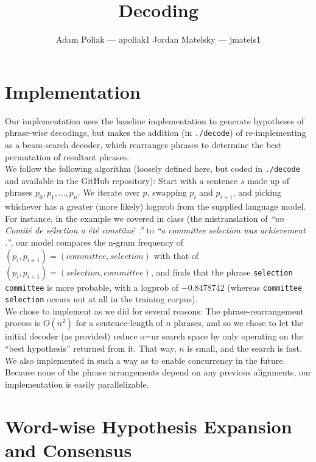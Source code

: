\documentclass[a4paper]{article}
\title{Decoding}
\author{Adam Poliak — apoliak1 \: Jordan Matelsky — jmatels1}
\begin{document}
\maketitle

\section{Implementation}
Our implementation uses the baseline implementation to generate hypotheses of phrase-wise decodings, but makes the addition (in \texttt{./decode}) of re-implementing as a beam-search decoder, which rearranges phrases to determine the best permutation of resultant phrases. \\

We follow the following algorithm (loosely defined here, but coded in \texttt{./decode} and available in the GitHub repository): Start with a sentence $s$ made up of phrases $p_0, p_1, \dots, p_n$. We iterate over $p$, swapping $p_i$ and $p_{i+1}$, and picking whichever has a greater (more likely) logprob from the supplied language model. \\

For instance, in the example we covered in class (the mistranslation of \textit{``un Comité de sélection a été constitué .''} to \textit{``a committee selection was achievement .''}, our model compares the n-gram frequency of $(p_i, p_{i+1})=({committee}, {selection})$ with that of $(p_i, p_{i+1})=({selection}, {committee})$, and finds that the phrase \texttt{selection committee} is more probable, with a logprob of $-0.8478742$ (whereas \texttt{committee selection} occurs not at all in the training corpus). \\

We chose to implement as we did for several reasons: The phrase-rearrangement process is $O(n^2)$ for a sentence-length of $n$ phrases, and so we chose to let the initial decoder (as provided) reduce o=ur search space  by only operating on the ``best hypothesis'' returned from it. That way, $n$ is small, and the search is fast. \\

We also implemented in such a way as to enable concurrency in the future. Because none of the phrase arrangements depend on any previous alignments, our implementation is easily parallelizable. \\

\section{Word-wise Hypothesis Expansion and Consensus}
\end{document}
